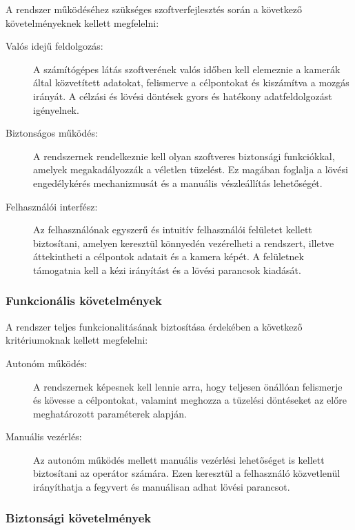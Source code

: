 \documentclass[12pt,a4paper]{article}
\begin{document}
A rendszer működéséhez szükséges szoftverfejlesztés során a következő követelményeknek kellett megfelelni:

\begin{description}
	\item[Valós idejű feldolgozás:]  A számítógépes látás szoftverének valós időben kell elemeznie a kamerák által közvetített adatokat, felismerve a célpontokat és kiszámítva a mozgás irányát. A célzási és lövési döntések gyors és hatékony adatfeldolgozást igényelnek.
	\item[Biztonságos működés:] A rendszernek rendelkeznie kell olyan szoftveres biztonsági funkciókkal, amelyek megakadályozzák a véletlen tüzelést. Ez magában foglalja a lövési engedélykérés mechanizmusát és a manuális vészleállítás lehetőségét.
	\item[Felhasználói interfész:] Az felhasználónak egyszerű és intuitív felhasználói felületet kellett biztosítani, amelyen keresztül könnyedén vezérelheti a rendszert, illetve áttekintheti a célpontok adatait és a kamera képét. A felületnek támogatnia kell a kézi irányítást és a lövési parancsok kiadását.
\end{description}



 
\subsubsection*{Funkcionális követelmények}

A rendszer teljes funkcionalitásának biztosítása érdekében a következő kritériumoknak kellett megfelelni:

\begin{description}
	\item[Autonóm működés:] A rendszernek képesnek kell lennie arra, hogy teljesen önállóan felismerje és kövesse a célpontokat, valamint meghozza a tüzelési döntéseket az előre meghatározott paraméterek alapján.
	\item[Manuális vezérlés:] Az autonóm működés mellett manuális vezérlési lehetőséget is kellett biztosítani az operátor számára. Ezen keresztül a felhasználó közvetlenül irányíthatja a fegyvert és manuálisan adhat lövési parancsot.
\end{description}

\subsubsection*{Biztonsági követelmények}
\end{document}
